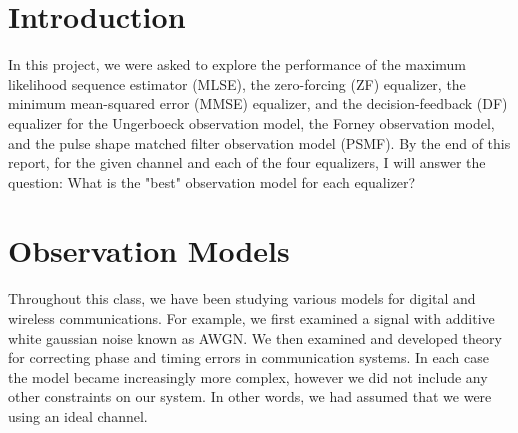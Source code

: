 

\usepackage{indentfirst}


\section{Introduction}

In this project, we were asked to explore the performance of the maximum likelihood sequence estimator (MLSE), the zero-forcing (ZF) equalizer, the minimum mean-squared error (MMSE) equalizer, and the decision-feedback (DF) equalizer for the Ungerboeck observation model, the Forney observation model, and the pulse shape matched filter observation model (PSMF). By the end of this report, for the given channel and each of the four equalizers, I will answer the question:  What is the "best" observation model for each equalizer?

\section{Observation Models}
Throughout this class, we have been studying various models for digital and wireless communications.  For example, we first examined a signal with additive white gaussian noise known as AWGN. We then examined and developed theory for correcting phase and timing errors in communication systems. In each case the model became increasingly more complex, however we did not include any other constraints on our system. In other words, we had assumed that we were using an ideal channel.

